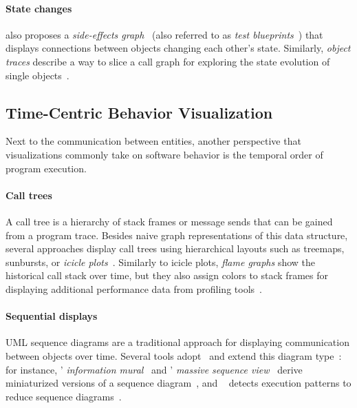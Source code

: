 \paragraph{State changes}

\Cite{lienhard2009flow} also proposes a \emph{side-effects graph}~\cite{fierz2009compass} (also referred to as \emph{test blueprints}~\cite{lienhard2008test}) that displays connections between objects changing each other's state.
Similarly, \emph{object traces} describe a way to slice a call graph for exploring the state evolution of single objects~\cite{thiede2023object,thiede2023time}.

\subsection{Time-Centric Behavior Visualization}

Next to the communication between entities, another perspective that visualizations commonly take on software behavior is the temporal order of program execution.

\paragraph{Call trees}

A call tree is a hierarchy of stack frames or message sends that can be gained from a program trace.
Besides naive graph representations of this data structure, several approaches display call trees using hierarchical layouts such as treemaps, sunbursts, or \emph{icicle plots}~\cite{kruskal1983icicle,trumper2012viewfusion,woodburn2019interactive}.
Similarly to icicle plots, \emph{flame graphs} show the historical call stack over time, but they also assign colors to stack frames for displaying additional performance data from profiling tools~\cite{gregg2016flame}.

\paragraph{Sequential displays}

UML sequence diagrams are a traditional approach for displaying communication between objects over time.
Several tools adopt~\cite{systä2001shimba} and extend this diagram type~\cite{hamouLhadj2004survey}: for instance, ' \emph{information mural}~\cite{jerding1998information} and ' \emph{massive sequence view}~\cite{cornelissen2009trace} derive miniaturized versions of a sequence diagram~\cite[sec. 3.4]{lemieux2006visualization}, and ~\cite{dePauw1998execution} detects execution patterns to reduce sequence diagrams~\cite{hamouLhadj2004survey}.

